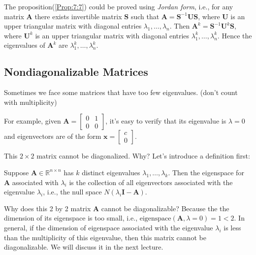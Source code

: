 \begin{remark}
The proposition(\ref{Prop:7:7}) could be proved using \emph{Jordan form}, i.e., for any matrix $\bm A$ there exists invertible matrix $\bm S$ such that $\bm A=\bm S^{-1}\bm U\bm S$, where $\bm U$ is an upper triangular matrix with diagonal entries $\lambda_1,\dots,\lambda_n$. Then $\bm A^k=\bm S^{-1}\bm U^k\bm S$, where $\bm U^k$ is an upper triangular matrix with diagonal entries $\lambda_1^k,\dots,\lambda_n^k$. Hence the eigenvalues of $\bm A^k$ are $\lambda_1^k,\dots,\lambda_n^k$.
\end{remark}

\subsection{Nondiagonalizable Matrices}
Sometimes we face some matrices that have too few eigenvalues. (don't count with multiplicity)

For example, given $\bm A=\begin{bmatrix}
0&1\\0&0
\end{bmatrix}$, it's easy to verify that its eigenvalue is $\lambda=0$ and eigenvectors are of the form $\bm x=\begin{bmatrix}
c\\0
\end{bmatrix}$.

This $2\times 2$ matrix cannot be diagonalized. Why? Let's introduce a definition first:
\begin{definition}[Eigenspace]
Suppose $\bm A\in\mathbb{R}^{n\times n}$ has $k$ distinct eigenvalues $\lambda_1,\dots,\lambda_k$. Then the eigenspace for $\bm A$ associated with $\lambda_i$ is the collection of all eigenvectors associated with the eigenvalue $\lambda_i$, i.e., the null space $N(\lambda_i\bm I-\bm A)$.
\end{definition}

Why does this 2 by 2 matrix $\bm A$ cannot be diagonalizable? Because the the dimension of its eigenspace is too small, i.e., $\mbox{eigenspace}(\bm A,\lambda=0)=1<2$. In general, if the dimension of eigenspace associated with the eigenvalue $\lambda_i$ is less than the multiplicity of this eigenvalue, then this matrix cannot be diagonalizable. We will discuss it in the next lecture.















